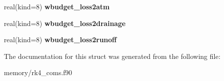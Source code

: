 \begin{DoxyCompactItemize}
\item 
\hypertarget{structrk4__coms_1_1rk4patchtype_a1ac1fd5a180e1c1b79dbce1f2bb6fe8b}{
real(kind=8) {\bfseries wbudget\_\-loss2atm}}
\label{structrk4__coms_1_1rk4patchtype_a1ac1fd5a180e1c1b79dbce1f2bb6fe8b}

\item 
\hypertarget{structrk4__coms_1_1rk4patchtype_a75224b0fce27f5ff820fc0b2b55cb8fc}{
real(kind=8) {\bfseries wbudget\_\-loss2drainage}}
\label{structrk4__coms_1_1rk4patchtype_a75224b0fce27f5ff820fc0b2b55cb8fc}

\item 
\hypertarget{structrk4__coms_1_1rk4patchtype_aa85e77ba1392352ea0c61466b5d6b542}{
real(kind=8) {\bfseries wbudget\_\-loss2runoff}}
\label{structrk4__coms_1_1rk4patchtype_aa85e77ba1392352ea0c61466b5d6b542}

\end{DoxyCompactItemize}


The documentation for this struct was generated from the following file:\begin{DoxyCompactItemize}
\item 
memory/rk4\_\-coms.f90\end{DoxyCompactItemize}
